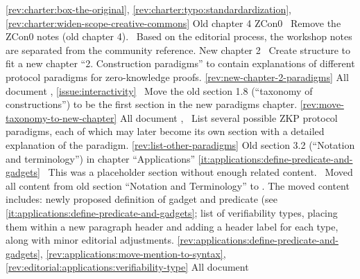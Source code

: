 \newcol \ref{rev:charter:box-the-original}, \ref{rev:charter:typo:standardardization}, \ref{rev:charter:widen-scope-creative-commons}
\rowendL
Old chapter 4 ZCon0
\newcol 
\newcol {}
\newcol \Chan\ Remove the ZCon0 notes (old chapter 4). \Note\ Based on the editorial process, 
				the workshop notes are separated from the community reference.
\newcol 
\rowendL
New chapter 2
\newcol 
\newcol {}
\newcol \Chan\ Create structure to fit a new chapter ``2. Construction paradigms'' to contain explanations 
	of different protocol paradigms for zero-knowledge proofs. 
\newcol \ref{rev:new-chapter-2-paradigms}
\rowendL
All document
\newcol 
\newcol {}, \ref{issue:interactivity}
\newcol \Chan\ Move the old section 1.8 (``taxonomy of constructions'') 
	to be the first section in the new paradigms chapter.
\newcol \ref{rev:move-taxonomy-to-new-chapter}
\rowendL
All document
\newcol 
\newcol {}, 
\newcol \Chan\ List several possible ZKP protocol paradigms, each of which may later 
	become its own section with a detailed explanation of the paradigm.
\newcol \ref{rev:list-other-paradigms}
\rowendL
Old section 3.2 (``Notation and terminology'') in chapter ``Applications''
\newcol 
\newcol \ref{it:applications:define-predicate-and-gadgets}
\newcol \Note\ This was a placeholder section without enough related content.
				\Chan\ Moved all content from old section ``Notation and Terminology'' to .
				The moved content includes: newly proposed definition of gadget and predicate (see \ref{it:applications:define-predicate-and-gadgets};
				list of verifiability types, placing them within a new paragraph header and adding a header label for each type, along with minor editorial adjustments.
\newcol \ref{rev:applications:define-predicate-and-gadgets}, \ref{rev:applications:move-mention-to-syntax}, \ref{rev:editorial:applications:verifiability-type}
\rowendL
All document
\newcol 
\newcol {}
\newcol \Chan\ 
\newcol 
\rowendL
\myendIssue
